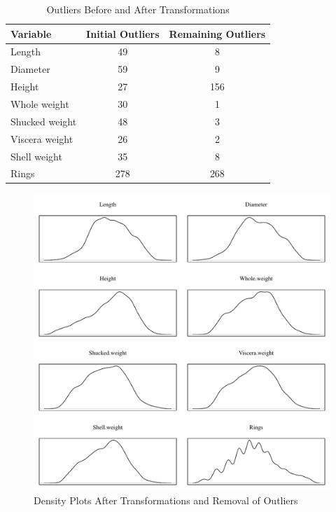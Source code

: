 \documentclass[11pt, a4paper]{article}
\begin{document}
    \begin{table}[ht]
        \centering
        \begin{tabular}{|l|c|c|}
            \hline
            Variable&Initial Outliers&Remaining Outliers \\
            \hline
            Length & 49 & 8 \\
            Diameter & 59 & 9 \\
            Height & 27 & 156 \\
            Whole weight & 30 & 1 \\
            Shucked weight & 48 & 3 \\
            Viscera weight & 26 & 2 \\
            Shell weight & 35 & 8 \\
            Rings & 278 & 268 \\
            \hline
        \end{tabular}
        \caption{Outliers Before and After Transformations}
        \label{outliers}
    \end{table}

    \begin{figure}[hbt!]
        \centering
        \includegraphics[width=\textwidth]{1.7.pdf}
        \caption{Density Plots After Transformations and Removal of Outliers}
        \label{density.t}
    \end{figure}
\end{document}
